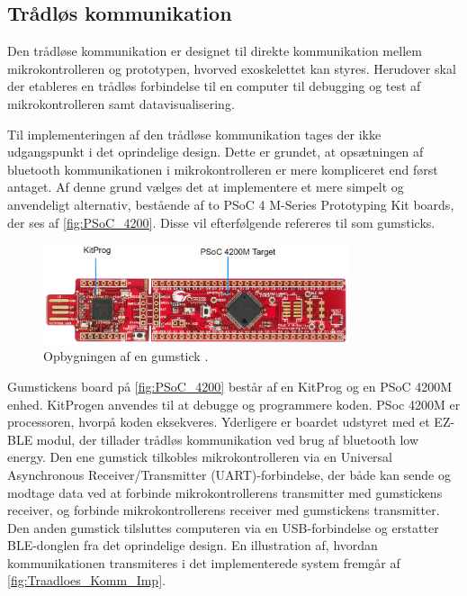\subsection{Trådløs kommunikation}\label{traadloes_komm_imp}
Den trådløse kommunikation er designet til direkte kommunikation mellem mikrokontrolleren og prototypen, hvorved exoskelettet kan styres. Herudover skal der etableres en trådløs forbindelse til en computer til debugging og test af mikrokontrolleren samt datavisualisering.   

\noindent
Til implementeringen af den trådløse kommunikation tages der ikke udgangspunkt i det oprindelige design. Dette er grundet, at opsætningen af bluetooth kommunikationen i mikrokontrolleren er mere kompliceret end først antaget.
Af denne grund vælges det at implementere et mere simpelt og anvendeligt alternativ, bestående af to PSoC 4 M-Series Prototyping Kit boards, der ses af \autoref{fig:PSoC_4200}. Disse vil efterfølgende refereres til som gumsticks. 

\begin{figure}[H]
	\centering
	\includegraphics[width=0.8\textwidth]{figures/PSoC_4200_opdelt}
	\caption{Opbygningen af en gumstick \citep{cypresspsoc42015}.}
	\label{fig:PSoC_4200}
\end{figure}

\noindent
Gumstickens board på \autoref{fig:PSoC_4200} består af en KitProg og en PSoC 4200M enhed. KitProgen anvendes til at debugge og programmere koden. PSoc 4200M er processoren, hvorpå koden eksekveres. Yderligere er boardet udstyret med et EZ-BLE modul, der tillader trådløs kommunikation ved brug af bluetooth low energy. 
Den ene gumstick tilkobles mikrokontrolleren via en Universal Asynchronous Receiver/Transmitter (UART)-forbindelse, der både kan sende og modtage data ved at forbinde mikrokontrollerens transmitter med gumstickens receiver, og forbinde mikrokontrollerens receiver med gumstickens transmitter. Den anden gumstick tilsluttes computeren via en USB-forbindelse og erstatter BLE-donglen fra det oprindelige design. En illustration af, hvordan kommunikationen transmiteres i det implementerede system fremgår af \autoref{fig:Traadloes_Komm_Imp}.

